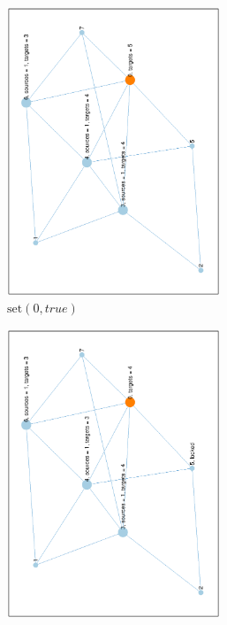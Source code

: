 \documentclass[12pt]{report}
\begin{document}
\begin{figure}[H]
\centering
\begin{subfigure}{0.45\textwidth}
	\includegraphics[width=0.7\textwidth,angle=-90]{graph/example/0.eps}
	\caption{$ \mathrm{set}(0, \mathit{true}) $}
\end{subfigure}
\begin{subfigure}{0.45\textwidth}
	\includegraphics[width=0.7\textwidth,angle=-90]{graph/example/1.eps}

\end{subfigure}
\end{figure}
\end{document}
